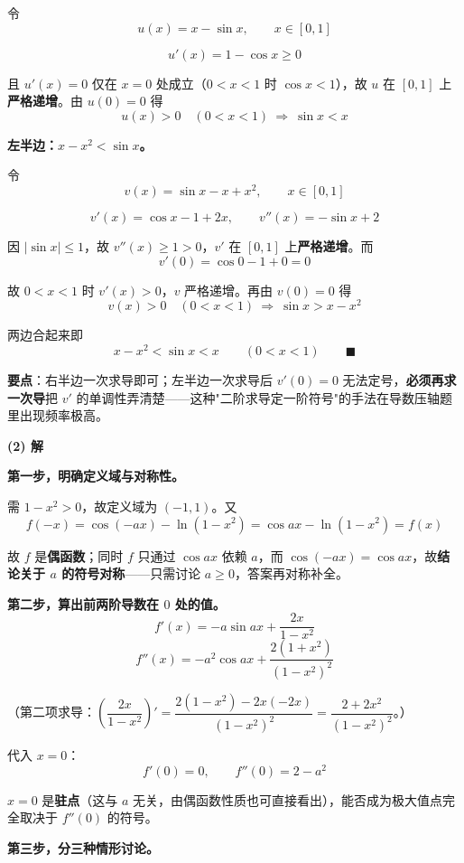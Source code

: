 令
\[u(x)=x-\sin x,\qquad x\in[0,1]\]

\[u'(x)=1-\cos x\ge0\]

且 $u'(x)=0$ 仅在 $x=0$ 处成立（$0<x<1$ 时 $\cos x<1$），故 $u$ 在 $[0,1]$ 上\textbf{严格递增}。由 $u(0)=0$ 得
\[u(x)>0\quad(0<x<1)\ \Longrightarrow\ \sin x<x\]

\textbf{左半边：$x-x^{2}<\sin x$。}

令
\[v(x)=\sin x-x+x^{2},\qquad x\in[0,1]\]

\[v'(x)=\cos x-1+2x,\qquad v''(x)=-\sin x+2\]

因 $|\sin x|\le1$，故 $v''(x)\ge1>0$，$v'$ 在 $[0,1]$ 上\textbf{严格递增}。而
\[v'(0)=\cos0-1+0=0\]

故 $0<x<1$ 时 $v'(x)>0$，$v$ 严格递增。再由 $v(0)=0$ 得
\[v(x)>0\quad(0<x<1)\ \Longrightarrow\ \sin x>x-x^{2}\]

两边合起来即
\[x-x^{2}<\sin x<x\qquad(0<x<1)\qquad\blacksquare\]

\begin{gktip}
\textbf{要点}：右半边一次求导即可；左半边一次求导后 $v'(0)=0$ 无法定号，\textbf{必须再求一次导}把 $v'$ 的单调性弄清楚——这种"二阶求导定一阶符号"的手法在导数压轴题里出现频率极高。
\end{gktip}

\par\medskip

\textbf{(2) 解}

\textbf{第一步，明确定义域与对称性。}

需 $1-x^{2}>0$，故定义域为 $(-1,1)$。又
\[f(-x)=\cos(-ax)-\ln\left(1-x^{2}\right)=\cos ax-\ln\left(1-x^{2}\right)=f(x)\]

故 $f$ 是\textbf{偶函数}；同时 $f$ 只通过 $\cos ax$ 依赖 $a$，而 $\cos(-ax)=\cos ax$，故\textbf{结论关于 $a$ 的符号对称}——只需讨论 $a\ge0$，答案再对称补全。

\textbf{第二步，算出前两阶导数在 $0$ 处的值。}
\[f'(x)=-a\sin ax+\frac{2x}{1-x^{2}}\]
\[f''(x)=-a^{2}\cos ax+\frac{2\left(1+x^{2}\right)}{\left(1-x^{2}\right)^{2}}\]

（第二项求导：$\left(\dfrac{2x}{1-x^{2}}\right)'=\dfrac{2\left(1-x^{2}\right)-2x(-2x)}{\left(1-x^{2}\right)^{2}}=\dfrac{2+2x^{2}}{\left(1-x^{2}\right)^{2}}$。）

代入 $x=0$：
\[f'(0)=0,\qquad f''(0)=2-a^{2}\]

$x=0$ 是\textbf{驻点}（这与 $a$ 无关，由偶函数性质也可直接看出），能否成为极大值点完全取决于 $f''(0)$ 的符号。

\textbf{第三步，分三种情形讨论。}


